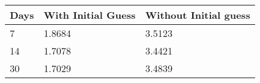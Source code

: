 \begin{tabular}{lll}
Days & With Initial Guess & Without Initial guess \\ 
\hline 
7 & 1.8684 & 3.5123 \\ 
14 & 1.7078 & 3.4421 \\ 
30 & 1.7029 & 3.4839 \\ 
\hline 
\end{tabular}